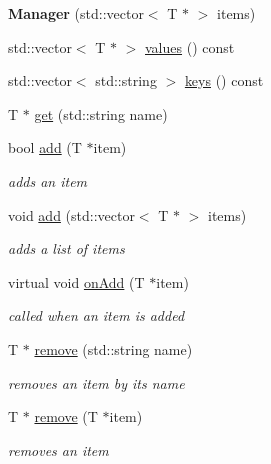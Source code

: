 \begin{DoxyCompactItemize}
\item 
\hypertarget{classdrobot_1_1object_1_1Manager_a383ef791e44bd1349e078ed183094e5f}{{\bfseries Manager} (std\-::vector$<$ T $\ast$ $>$ items)}\label{classdrobot_1_1object_1_1Manager_a383ef791e44bd1349e078ed183094e5f}

\item 
std\-::vector$<$ T $\ast$ $>$ \hyperlink{classdrobot_1_1object_1_1Manager_a4a9b34e5b7f42b6acafc99bde8d02e61}{values} () const 
\item 
std\-::vector$<$ std\-::string $>$ \hyperlink{classdrobot_1_1object_1_1Manager_a50065ba053bb7e4ebbb0982b2c41abc7}{keys} () const 
\item 
T $\ast$ \hyperlink{classdrobot_1_1object_1_1Manager_a5e04e5974661624d8700b9013dc35246}{get} (std\-::string name)
\item 
bool \hyperlink{classdrobot_1_1object_1_1Manager_a2ef8b37b97245a3b525f0f7cc8a68049}{add} (T $\ast$item)
\begin{DoxyCompactList}\small\item\em adds an item \end{DoxyCompactList}\item 
void \hyperlink{classdrobot_1_1object_1_1Manager_af14a346a13fa1948e97c35458d5f3047}{add} (std\-::vector$<$ T $\ast$ $>$ items)
\begin{DoxyCompactList}\small\item\em adds a list of items \end{DoxyCompactList}\item 
virtual void \hyperlink{classdrobot_1_1object_1_1Manager_ae1a7f38749f66bc4be0e0e0350a5ae68}{on\-Add} (T $\ast$item)
\begin{DoxyCompactList}\small\item\em called when an item is added \end{DoxyCompactList}\item 
T $\ast$ \hyperlink{classdrobot_1_1object_1_1Manager_ad2023f514760d5ae1a4c72f00724e4e9}{remove} (std\-::string name)
\begin{DoxyCompactList}\small\item\em removes an item by its name \end{DoxyCompactList}\item 
T $\ast$ \hyperlink{classdrobot_1_1object_1_1Manager_a1e60717d659da8a4b83d9b6397f0926e}{remove} (T $\ast$item)
\begin{DoxyCompactList}\small\item\em removes an item \end{DoxyCompactList}\item 

\end{DoxyCompactItemize}

